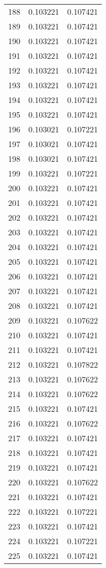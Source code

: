 \begin{longtable}{rrr}
188 & 0.103221 & 0.107421 \\
189 & 0.103221 & 0.107421 \\
190 & 0.103221 & 0.107421 \\
191 & 0.103221 & 0.107421 \\
192 & 0.103221 & 0.107421 \\
193 & 0.103221 & 0.107421 \\
194 & 0.103221 & 0.107421 \\
195 & 0.103221 & 0.107421 \\
196 & 0.103021 & 0.107221 \\
197 & 0.103021 & 0.107421 \\
198 & 0.103021 & 0.107421 \\
199 & 0.103221 & 0.107221 \\
200 & 0.103221 & 0.107421 \\
201 & 0.103221 & 0.107421 \\
202 & 0.103221 & 0.107421 \\
203 & 0.103221 & 0.107421 \\
204 & 0.103221 & 0.107421 \\
205 & 0.103221 & 0.107421 \\
206 & 0.103221 & 0.107421 \\
207 & 0.103221 & 0.107421 \\
208 & 0.103221 & 0.107421 \\
209 & 0.103221 & 0.107622 \\
210 & 0.103221 & 0.107421 \\
211 & 0.103221 & 0.107421 \\
212 & 0.103221 & 0.107822 \\
213 & 0.103221 & 0.107622 \\
214 & 0.103221 & 0.107622 \\
215 & 0.103221 & 0.107421 \\
216 & 0.103221 & 0.107622 \\
217 & 0.103221 & 0.107421 \\
218 & 0.103221 & 0.107421 \\
219 & 0.103221 & 0.107421 \\
220 & 0.103221 & 0.107622 \\
221 & 0.103221 & 0.107421 \\
222 & 0.103221 & 0.107221 \\
223 & 0.103221 & 0.107421 \\
224 & 0.103221 & 0.107221 \\
225 & 0.103221 & 0.107421 \\

\end{longtable}
